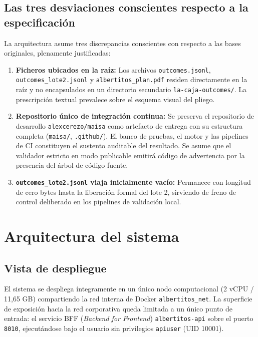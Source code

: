 \documentclass[11pt,a4paper]{article}
\begin{document}
\subsection{Las tres desviaciones conscientes respecto a la especificación}
La arquitectura asume tres discrepancias conscientes con respecto a las bases originales, plenamente justificadas:
\begin{enumerate}
    \item \textbf{Ficheros ubicados en la raíz:} Los archivos \texttt{outcomes.jsonl}, \texttt{outcomes\_lote2.jsonl} y \texttt{albertitos\_plan.pdf} residen directamente en la raíz y no encapsulados en un directorio secundario \texttt{la-caja-outcomes/}. La prescripción textual prevalece sobre el esquema visual del pliego.
    \item \textbf{Repositorio único de integración continua:} Se preserva el repositorio de desarrollo \texttt{alexcerezo/maisa} como artefacto de entrega con su estructura completa (\texttt{maisa/}, \texttt{.github/}). El banco de pruebas, el motor y las pipelines de CI constituyen el sustento auditable del resultado. Se asume que el validador estricto en modo publicable emitirá código de advertencia por la presencia del árbol de código fuente.
    \item \textbf{\texttt{outcomes\_lote2.jsonl} viaja inicialmente vacío:} Permanece con longitud de cero bytes hasta la liberación formal del lote 2, sirviendo de freno de control deliberado en los pipelines de validación local.
\end{enumerate}

\section{Arquitectura del sistema}

\subsection{Vista de despliegue}
El sistema se despliega íntegramente en un único nodo computacional (2 vCPU / 11,65 GB) compartiendo la red interna de Docker \texttt{albertitos\_net}. La superficie de exposición hacia la red corporativa queda limitada a un único punto de entrada: el servicio BFF (\textit{Backend for Frontend}) \texttt{albertitos-api} sobre el puerto \texttt{8010}, ejecutándose bajo el usuario sin privilegios \texttt{apiuser} (UID 10001).
\end{document}

